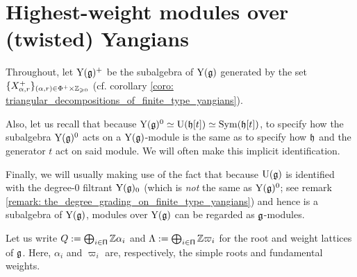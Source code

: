 \section{Highest-weight modules over (twisted) Yangians} \label{section: highest_weight_modules_for_finite_yangians}
    \begin{convention}
        Throughout, let $\mathrm{Y}(\mathfrak{g})^+$ be the  subalgebra of $\mathrm{Y}(\mathfrak{g})$ generated by the set $\{ X^+_{\alpha, r} \}_{(\alpha, r) \in \Phi^+ \x \Z_{\geq 0}}$ (cf. corollary \ref{coro: triangular_decompositions_of_finite_type_yangians}).

        Also, let us recall that because $\mathrm{Y}(\mathfrak{g})^0 \simeq \mathrm{U}(\mathfrak{h}[t]) \simeq \mathrm{Sym}(\mathfrak{h}[t])$, to specify how the subalgebra $\mathrm{Y}(\mathfrak{g})^0$ acts on a $\mathrm{Y}(\mathfrak{g})$-module is the same as to specify how $\mathfrak{h}$ and the generator $t$ act on said module. We will often make this implicit identification.

        Finally, we will usually making use of the fact that because $\mathrm{U}(\mathfrak{g})$ is identified with the degree-$0$ filtrant $\mathrm{Y}(\mathfrak{g})_0$ (which is \textit{not} the same as $\mathrm{Y}(\mathfrak{g})^0$; see remark \ref{remark: the_degree_grading_on_finite_type_yangians}) and hence is a subalgebra of $\mathrm{Y}(\mathfrak{g})$, modules over $\mathrm{Y}(\mathfrak{g})$ can be regarded as $\mathfrak{g}$-modules.
    \end{convention}

    \begin{convention}
        Let us write $Q := \bigoplus_{i \in \mathsf{\Pi}} \mathbb{Z} \alpha_i$ and $\Lambda := \bigoplus_{i \in \mathsf{\Pi}} \mathbb{Z} \varpi_i$ for the root and weight lattices of $\mathfrak{g}$. Here, $\alpha_i$ and $\varpi_i$ are, respectively, the simple roots and fundamental weights.
    \end{convention}

